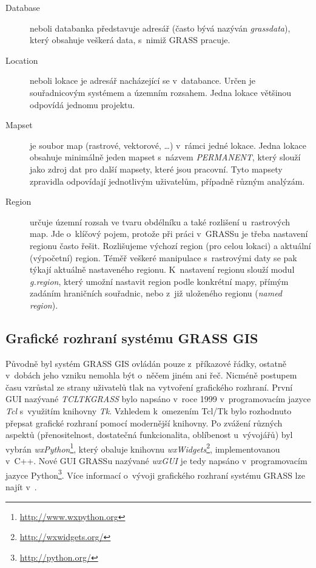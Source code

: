 \documentclass[a4paper,12pt,draft]{article}
\newif\ifbc %
\begin{document}
\begin{description}
\item[Database] neboli databanka představuje adresář (často bývá nazýván 
\emph{grassdata}), který obsahuje veškerá data, s~nimiž GRASS pracuje.
\item [Location] neboli lokace je adresář nacházející se
v~databance. Určen je souřadni\-covým systémem a územním rozsahem. Jedna
lokace většinou odpovídá jednomu projektu.
\item [Mapset] je soubor map (rastrové, vektorové, \ldots) v~rámci
jedné lokace. Jedna lokace obsahuje minimálně jeden mapset s~názvem
\emph{PERMANENT}, který  slouží jako zdroj dat pro další mapsety, které jsou
pracovní. Tyto mapsety zpravidla odpovídají jednotlivým uživatelům,
případně různým analýzám.
\item [Region] určuje územní rozsah ve tvaru obdélníku a také
rozlišení u~rastrových map. Jde o~klíčový
pojem, protože při práci v~GRASSu je třeba nastavení regionu často
řešit.  Rozlišujeme výchozí region (pro celou lokaci) a aktuální
(výpočetní) region. Téměř veškeré manipulace s~rastrovými daty se pak
týkají aktuálně nastaveného regionu. K~nastavení regionu slouží
modul \emph{g.region}, který umožní nastavit region podle konkrétní mapy,
přímým zadá\-ním hraničních souřadnic, nebo z~již uloženého regionu
(\emph{named region}).
 \end{description}



\subsection{Grafické rozhraní systému GRASS GIS}
Původně byl systém GRASS GIS ovládán pouze z~příkazové
řádky, ostatně v~dobách jeho vzniku nemohla být o~něčem jiném ani
řeč. Nicméně postupem času vzrůstal ze strany uživatelů tlak na
vytvoření grafického rozhraní. První GUI nazývané \emph{TCLTKGRASS}
bylo napsáno v~roce 1999 v~programovacím jazyce \emph{Tcl} s~využitím
knihovny \emph{Tk}.
\ifbc
Nástupcem byly v~dalších verzích GRASS 6 \emph{Display
Manager} a poté \emph{GIS Manager}, stále napsané pomocí Tcl/Tk.  \fi Vzhledem
k~omezením Tcl/Tk bylo rozhodnuto přepsat grafické rozhraní pomocí
modernější knihovny. Po zvážení různých aspektů (přenositel\-nost,
dostatečná funkcionalita, oblíbenost u~vývojářů) 
byl vybrán \emph{wxPython}\footnote{\url{http://www.wxpython.org}}, který
obaluje knihovnu \emph{wxWidgets}\footnote{\url{http://wxwidgets.org/}},
implementovanou v~C++. Nové GUI GRASSu \ifbc\else nazý\-vané \emph{wxGUI} \fi je
tedy napsáno v~programovacím jazyce
Python\footnote{\url{http://python.org/}}.
Více informací o~vývoji grafického rozhraní systému GRASS lze najít
v~\cite{wxGUI_clanek}.
\end{document}
